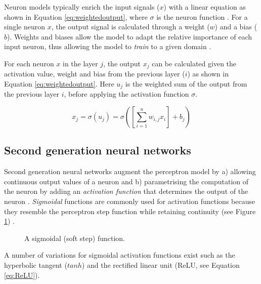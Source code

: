 \documentclass[report.tex]{subfiles}
\begin{document}
Neuron models typically enrich the
input signals ($x$) with a linear equation as shown in Equation \ref{eq:weightedoutput},
where $\sigma$ is the neuron function
\cite{Schmidhuber2014, Russel2007}. 
For a single neuron $x$, the output signal is calculated through a weight ($w$)
and a bias ($b$). 
Weights and biases allow the model to adapt the relative importance of each
input neuron, thus allowing the
model to \textit{train} to a given domain \cite{Schmidhuber2014, Russel2007}.

For each neuron $x$ in the layer $j$, the output $x_j$ can be calculated given the activation value,
weight and bias from the previous layer ($i$) as shown in Equation
\ref{eq:weightedoutput}.
Here $u_j$ is the weighted sum of the output from the previous layer $i$, before
applying the activation function $\sigma$.

\begin{equation} \label{eq:weightedoutput}
x_j = \sigma(u_j) = \sigma\left(\left[\sum_{i=1}^n w_{i,j} x_i\right] + b_j \right)
\end{equation}

\subsection{Second generation neural networks}
Second generation neural networks augment the perceptron model by
a) allowing continuous output values of a neuron and b) parametrising
the computation of the neuron by adding an \textit{activation function}
 that determines the output of the neuron
\cite{Maass1997}.
\textit{Sigmoidal} functions are commonly used for activation functions
because they resemble the perceptron step function while 
retaining continuity (see Figure \ref{fig:sigmoid})
\cite{Maass1997}.

\begin{figure}
\centering
{}
\caption{A sigmoidal (soft step) function.}
\label{fig:sigmoid}
\end{figure}

A number of variations for sigmoidal activation functions exist such as the 
hyperbolic tangent ($tanh$) and
the rectified linear unit  (ReLU, see Equation \ref{eq:ReLU}). 
\end{document}

